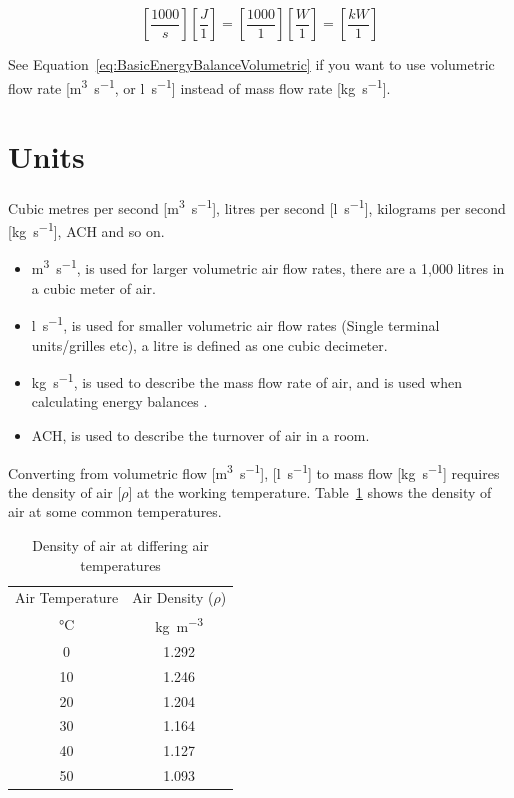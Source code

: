 \begin{equation}\label{eq:BasicEnergyBalanceDimensionalEnd}
\left[ \frac{1000}{s} \right] \left[ \frac{J}{1} \right] = \left[ \frac{1000}{1} \right] \left[ \frac{W}{1} \right] = \left[ \frac{kW}{1} \right]
\end{equation}

See Equation~\ref{eq:BasicEnergyBalanceVolumetric} if you want to use volumetric flow rate [\si{\cubic\metre\per\second}, or \si{\litre\per\second}] instead of mass flow rate [\si{\kilo\gram\per\second}].

\section{Units}
\label{sec:Units}

Cubic metres per second [\si{\cubic\metre\per\second}], litres per second [\si{\litre\per\second}], kilograms per second [\si{\kilo\gram\per\second}], \gls{ACH} and so on.

\begin{itemize}
\item \si{\cubic\metre\per\second}, is used for larger volumetric air flow rates, there are a 1,000 litres in a cubic meter of air.

\item \si{\litre\per\second}, is used for smaller volumetric air flow rates (Single terminal units/grilles etc), a litre is defined as one cubic decimeter.

\item \si{\kilo\gram\per\second}, is used to describe the mass flow rate of air, and is used when calculating energy balances .

\item \gls{ACH}, is used to describe the turnover of air in a room.
\end{itemize}

Converting from volumetric flow [\si{\cubic\metre\per\second}], [\si{\litre\per\second}] to mass flow [\si{\kilo\gram\per\second}] requires the density of air [$\rho$] at the working temperature.  Table~\ref{tb:densityOfAir} shows the density of air at some common temperatures.

\begin{table}[htb]
\centering
\begin{tabular}{cc}
\hline
Air Temperature & Air Density ($\rho$)\\
\si{\celsius} & \si{\kilo\gram\per\cubic\metre}\\
\hline
0 & 1.292\\
10 & 1.246\\
20 & 1.204\\
30 & 1.164\\
40 & 1.127\\
50 & 1.093\\
\hline
\end{tabular}
\caption{Density of air at differing air temperatures}
\label{tb:densityOfAir}
\end{table}

